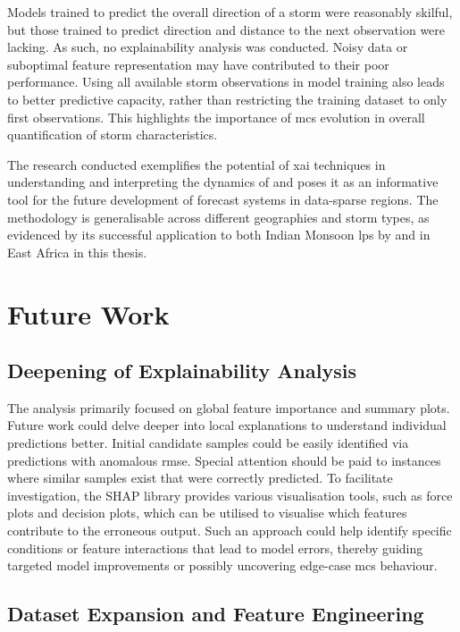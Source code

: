 Models trained to predict the overall direction of a storm were reasonably skilful, but those trained to predict direction and distance to the next observation were lacking. As such, no explainability analysis was conducted. Noisy data or suboptimal feature representation may have contributed to their poor performance. Using all available storm observations in model training also leads to better predictive capacity, rather than restricting the training dataset to only first observations. This highlights the importance of \acrshort{mcs} evolution in overall quantification of storm characteristics.

The research conducted exemplifies the potential of \acrshort{xai} techniques in understanding and interpreting the dynamics of  and poses it as an informative tool for the future development of forecast systems in data-sparse regions. The methodology is generalisable across different geographies and storm types, as evidenced by its successful application to both Indian Monsoon \acrlong{lps} by \cite{Hunt2024} and  in East Africa in this thesis.

\section{Future Work}
\label{sec:future-work}

\subsection{Deepening of Explainability Analysis}

The analysis primarily focused on global feature importance and summary plots. Future work could delve deeper into local explanations to understand individual predictions better. Initial candidate samples could be easily identified via predictions with anomalous \acrshort{rmse}. Special attention should be paid to instances where similar samples exist that were correctly predicted. To facilitate investigation, the SHAP library provides various visualisation tools, such as force plots and decision plots, which can be utilised to visualise which features contribute to the erroneous output. Such an approach could help identify specific conditions or feature interactions that lead to model errors, thereby guiding targeted model improvements or possibly uncovering edge-case \acrshort{mcs} behaviour.

\subsection{Dataset Expansion and Feature Engineering}

